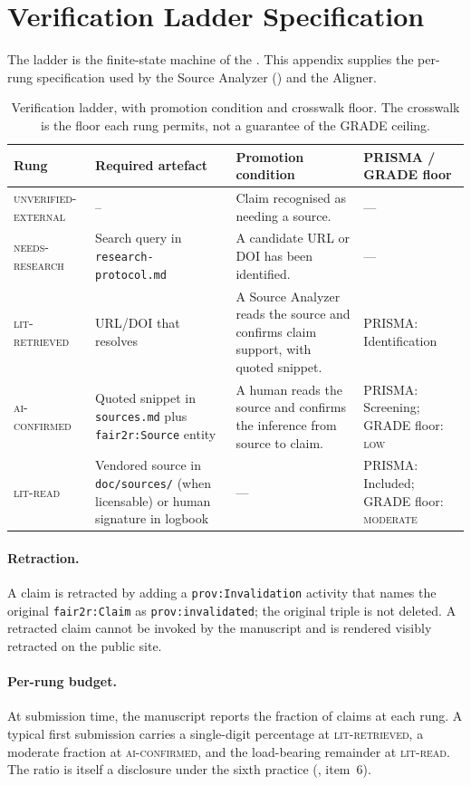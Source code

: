 \section{Verification Ladder Specification}
\label{sec:appendix-ladder}
\label{app:ladder}

The ladder is the finite-state machine of the .
This appendix supplies the per-rung specification used by the
Source Analyzer () and the Aligner.

\begin{table}[!ht]
\centering
\small
\begin{tabular}{lp{2.4cm}p{4.0cm}p{4.5cm}}
\toprule
\textbf{Rung} & \textbf{Required artefact} & \textbf{Promotion condition} & \textbf{PRISMA / GRADE floor} \\
\midrule
\textsc{unverified-external}
  & --
  & Claim recognised as needing a source.
  & --- \\
\textsc{needs-research}
  & Search query in \texttt{research-protocol.md}
  & A candidate URL or DOI has been identified.
  & --- \\
\textsc{lit-retrieved}
  & URL/DOI that resolves
  & A Source Analyzer reads the source and confirms claim support, with quoted snippet.
  & PRISMA: Identification \\
\textsc{ai-confirmed}
  & Quoted snippet in \texttt{sources.md} plus \texttt{fair2r:Source} entity
  & A human reads the source and confirms the inference from source to claim.
  & PRISMA: Screening; GRADE floor: \textsc{low} \\
\textsc{lit-read}
  & Vendored source in \texttt{doc/sources/} (when licensable) or human signature in logbook
  & ---
  & PRISMA: Included; GRADE floor: \textsc{moderate} \\
\bottomrule
\end{tabular}
\caption{Verification ladder, with promotion condition and crosswalk
floor. The crosswalk is the floor each rung permits, not a guarantee of
the GRADE ceiling.}
\label{tab:ladder}
\end{table}

\paragraph{Retraction.}
A claim is retracted by adding a \texttt{prov:Invalidation} activity
that names the original \texttt{fair2r:Claim} as
\texttt{prov:invalidated}; the original triple is not deleted. A
retracted claim cannot be invoked by the manuscript and is rendered
visibly retracted on the public site.

\paragraph{Per-rung budget.}
At submission time, the manuscript reports the fraction of claims at
each rung. A typical first submission carries a single-digit
percentage at \textsc{lit-retrieved}, a moderate fraction at
\textsc{ai-confirmed}, and the load-bearing remainder at
\textsc{lit-read}. The ratio is itself a disclosure under the sixth
practice (, item~6).
